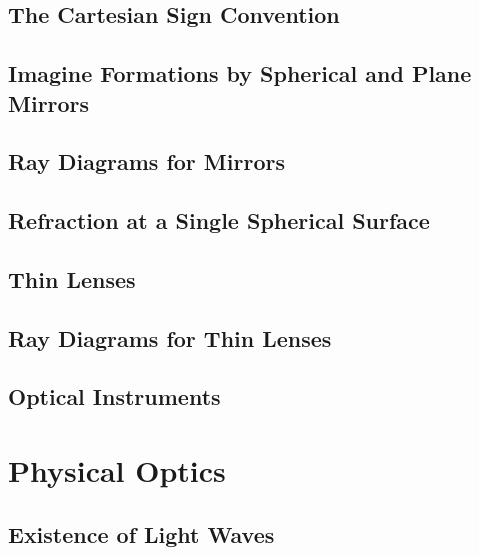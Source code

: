 \documentclass[twocolumn]{article}
\begin{document}
\subsection{The Cartesian Sign Convention}
\begin{outline}
\1 
\end{outline}
\subsection{Imagine Formations by Spherical and Plane Mirrors}
\begin{outline}
\1 
\end{outline}
\subsection{Ray Diagrams for Mirrors}
\begin{outline}
\1 
\end{outline}
\subsection{Refraction at a Single Spherical Surface}
\begin{outline}
\1 
\end{outline}
\subsection{Thin Lenses}
\begin{outline}
\1 
\end{outline}
\subsection{Ray Diagrams for Thin Lenses}
\begin{outline}
\1 
\end{outline}
\subsection{Optical Instruments}
\begin{outline}
\1 
\end{outline}
\section{Physical Optics}
\subsection{Existence of Light Waves}
\begin{outline}
\1 
\end{outline}
\end{document}
